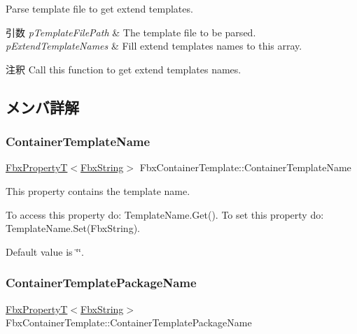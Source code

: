 Parse template file to get extend templates. 
\begin{DoxyParams}{引数}
{\em p\+Template\+File\+Path} & The template file to be parsed. \\
\hline
{\em p\+Extend\+Template\+Names} & Fill extend templates\textquotesingle{} names to this array. \\
\hline
\end{DoxyParams}
\begin{DoxyRemark}{注釈}
Call this function to get extend templates\textquotesingle{} names. 
\end{DoxyRemark}


\subsection{メンバ詳解}
\mbox{\label{class_fbx_container_template_ae30cc6c47849ef02f82707c8691df636}} 
\subsubsection{\texorpdfstring{Container\+Template\+Name}{ContainerTemplateName}}
{\footnotesize\ttfamily \hyperlink{class_fbx_property_t}{Fbx\+PropertyT}$<$\hyperlink{class_fbx_string}{Fbx\+String}$>$ Fbx\+Container\+Template\+::\+Container\+Template\+Name}

This property contains the template name.

To access this property do\+: Template\+Name.\+Get(). To set this property do\+: Template\+Name.\+Set(\+Fbx\+String).

Default value is \char`\"{}\char`\"{}. \mbox{\label{class_fbx_container_template_a6f0973e4624ac59f1c0af9e172f224c1}} 
\subsubsection{\texorpdfstring{Container\+Template\+Package\+Name}{ContainerTemplatePackageName}}
{\footnotesize\ttfamily \hyperlink{class_fbx_property_t}{Fbx\+PropertyT}$<$\hyperlink{class_fbx_string}{Fbx\+String}$>$ Fbx\+Container\+Template\+::\+Container\+Template\+Package\+Name}

